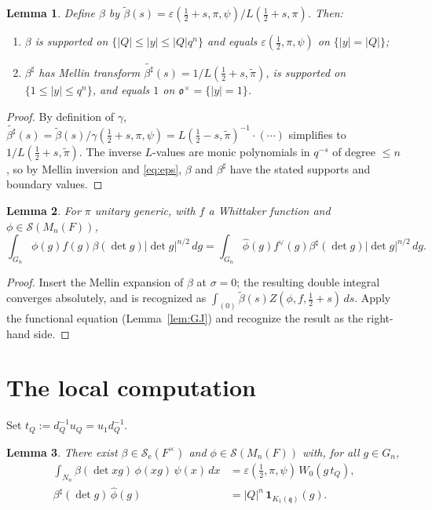 \documentclass[11pt]{article}
\newcommand{\F}{F}
\newcommand{\oo}{\mathfrak{o}}
\newcommand{\qq}{\mathfrak{q}}
\newcommand{\Mn}{M_n}
\newcommand{\Se}{\mathcal{S}_{\mathrm e}}
\newcommand{\Sw}{\mathcal{S}}
\newcommand{\ttilde}[1]{\widetilde{#1}}
\newtheorem{lemma}{Lemma}
\begin{document}
\begin{lemma}\label{lem:beta}
Define $\beta$ by $\tilde\beta(s)=\varepsilon(\tfrac12+s,\pi,\psi)/L(\tfrac12+s,\pi)$.
Then:
\begin{enumerate}\setlength\itemsep{2pt}
\item $\beta$ is supported on $\{|Q|\le|y|\le|Q|q^n\}$ and equals
$\varepsilon(\tfrac12,\pi,\psi)$ on $\{|y|=|Q|\}$;
\item $\beta^\sharp$ has Mellin transform $\widetilde{\beta^\sharp}(s)=1/L(\tfrac12+s,\ttilde\pi)$,
is supported on $\{1\le|y|\le q^n\}$, and equals $1$ on $\oo^\times=\{|y|=1\}$.
\end{enumerate}
\end{lemma}

\begin{proof}
By definition of $\gamma$, $\widetilde{\beta^\sharp}(s)=\tilde\beta(s)/\gamma(\tfrac12+s,\pi,\psi)
=L(\tfrac12-s,\ttilde\pi)^{-1}\cdot(\cdots)$ simplifies to $1/L(\tfrac12+s,\ttilde\pi)$.
The inverse $L$-values are monic polynomials in $q^{-s}$ of degree $\le n$, so by
Mellin inversion and \eqref{eq:eps}, $\beta$ and $\beta^\sharp$ have the stated
supports and boundary values.
\end{proof}

\begin{lemma}\label{lem:transfer}
For $\pi$ unitary generic, with $f$ a Whittaker function and
$\phi\in\Sw(\Mn(\F))$,
\[
\int_{G_n}\phi(g)f(g)\beta(\det g)|\det g|^{n/2}\,dg
=\int_{G_n}\widehat\phi(g)f^\vee(g)\beta^\sharp(\det g)|\det g|^{n/2}\,dg.
\]
\end{lemma}

\begin{proof}
Insert the Mellin expansion of $\beta$ at $\sigma=0$; the resulting double
integral converges absolutely, and is recognized as
$\int_{(0)}\tilde\beta(s)Z(\phi,f,\tfrac12+s)\,ds$. Apply the functional equation
(Lemma~\ref{lem:GJ}) and recognize the result as the right-hand side.
\end{proof}

\section*{The local computation}

Set $t_Q:=d_Q^{-1}u_Q=u_1 d_Q^{-1}$.

\begin{lemma}\label{lem:relations}
There exist $\beta\in\Se(\F^\times)$ and $\phi\in\Sw(\Mn(\F))$ with, for all
$g\in G_n$,
\begin{align}
\int_{N_n}\beta(\det xg)\,\phi(xg)\,\psi(x)\,dx
&=\varepsilon(\tfrac12,\pi,\psi)\,W_0(g\,t_Q),\label{eq:rel1}\\
\beta^\sharp(\det g)\,\widehat\phi(g)&=|Q|^n\,\mathbf 1_{K_1(\qq)}(g).\label{eq:rel2}
\end{align}
\end{lemma}
\end{document}

